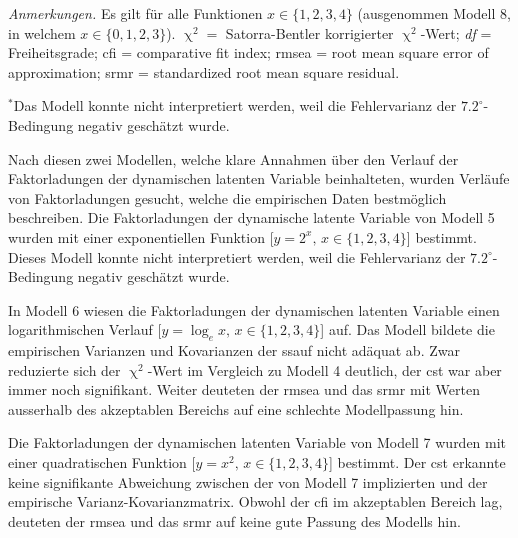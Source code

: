 \documentclass[11pt, twoside, a4paper]{book}		%
\begin{document}
\begin{table}[ht]
\begin{adjustbox}{width=1\textwidth}
\begin{threeparttable}
			\begin{tablenotes}[flushleft]
				\footnotesize				%
				\setlength{}	%
				\item \textit{Anmerkungen.} Es gilt für alle Funktionen $x\in\{1,2,3,4\}$ (ausgenommen Modell 8, in welchem $x\in\{0,1,2,3\}$). $\upchi^2 =$ Satorra-Bentler \citeyearpar{Satorra1994} korrigierter $\upchi^2$-Wert; \textit{df} = Freiheitsgrade; \gls{cfi} = comparative fit index; \gls{rmsea} = root mean square error of approximation; \gls{srmr} = standardized root mean square residual.
				\item {$^*$}Das Modell konnte nicht interpretiert werden, weil die Fehlervarianz der $7.2^{\circ}$-Bedingung negativ geschätzt wurde.
			\end{tablenotes}
		\end{threeparttable}
	\end{adjustbox}
\end{table}

Nach diesen zwei Modellen, welche klare Annahmen über den Verlauf der Faktorladungen der dynamischen latenten Variable beinhalteten, wurden Verläufe von Faktorladungen gesucht, welche die empirischen Daten bestmöglich beschreiben. 
Die Faktorladungen der dynamische latente Variable von Modell 5 wurden mit einer exponentiellen Funktion [$y=2^x,\,x\in\{1, 2, 3, 4\}$] bestimmt. Dieses Modell konnte nicht interpretiert werden, weil die Fehlervarianz der $7.2^{\circ}$-Bedingung negativ geschätzt wurde. 

In Modell 6 wiesen die Faktorladungen der dynamischen latenten Variable einen logarithmischen Verlauf [$y=\log_{e}x,\,x\in\{1, 2, 3, 4\}$] auf. Das Modell bildete die empirischen Varianzen und Kovarianzen der \gls{ssauf} nicht adäquat ab. Zwar reduzierte sich der $\upchi^2$-Wert im Vergleich zu Modell 4 deutlich, der \gls{cst} war aber immer noch signifikant. Weiter deuteten der \gls{rmsea} und das \gls{srmr} mit Werten ausserhalb des akzeptablen Bereichs auf eine schlechte Modellpassung hin.

Die Faktorladungen der dynamischen latenten Variable von Modell 7 wurden mit einer quadratischen Funktion [$y=x^2,\,x\in\{1, 2, 3, 4\}$] bestimmt. Der \gls{cst} erkannte keine signifikante Abweichung zwischen der von Modell 7 implizierten und der empirische Var\-ianz-Ko\-var\-ianz\-ma\-trix. Obwohl der \gls{cfi} im akzeptablen Bereich lag, deuteten der \gls{rmsea} und das \gls{srmr} auf keine gute Passung des Modells hin.
\end{document}

